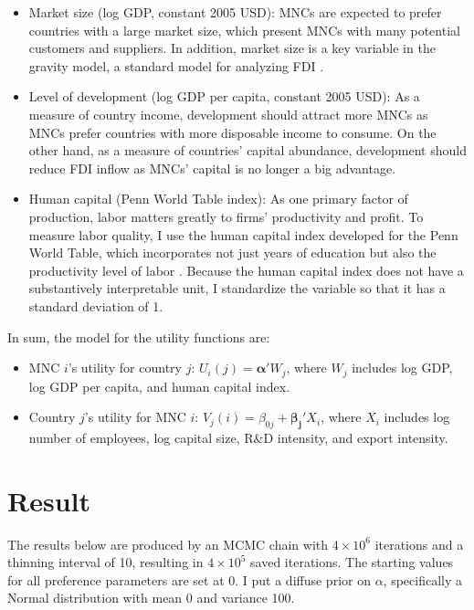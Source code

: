 \begin{itemize}
\item Market size (log GDP, constant 2005 USD): MNCs are expected to prefer countries with a large market
  size, which present MNCs with many potential customers and suppliers. In
  addition, market size is a key variable in the gravity
  model, a standard model for analyzing FDI \citep{Bergstrand2007}.

\item Level of development (log GDP per capita, constant 2005 USD): As a measure
  of country income, development should attract more MNCs as MNCs prefer
  countries  with
  more disposable income to consume. On the other hand, as a measure of
  countries' capital
  abundance, development should reduce FDI inflow as MNCs' capital is no longer
  a big advantage.

\item Human capital (Penn World Table index): As one primary factor of
  production, labor matters greatly to firms' productivity and profit. To
  measure labor quality, I use the human capital index developed for the Penn World
  Table, which incorporates not just years of education but also the
  productivity level of labor
  \citep{Feenstra2015}. Because the human capital index does not have a
  substantively interpretable unit, I standardize the variable so that it has a
  standard deviation of 1.
\end{itemize}

In sum, the model for the utility functions are:

\begin{itemize}
\item MNC $i$'s utility for country $j$: $U_i(j) = \bm{\alpha}' W_j $, where $W_j$ includes log GDP, log GDP per capita, and human capital index.
\item Country $j$'s utility for MNC $i$: $V_j(i) = \beta_{0j} + \bm{\beta_j}'
  X_i$, where $X_i$ includes log number of employees, log capital size, R\&D intensity, and
export intensity. 
\end{itemize}

\section{Result}
\label{sec:Japan_result}

The results below are produced by an MCMC chain with $4 \times 10^6$ iterations and a
thinning interval of 10, resulting in $4 \times 10^5$ saved iterations. The starting
values for all preference parameters are set at 0. I put a diffuse prior on
$\alpha$, specifically a Normal distribution with mean 0 and variance 100.

